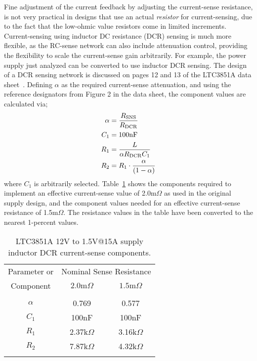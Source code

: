 Fine adjustment of the current feedback by adjusting the
current-sense resistance, is not very practical in designs that use an
actual {\em resistor} for current-sensing, due to the fact that the
low-ohmic value resistors come in limited increments. Current-sensing using
inductor DC resistance (DCR) sensing is much more flexible, as the RC-sense network
can also include attenuation control, providing the flexibility
to scale the current-sense gain arbitrarily. 
%
For example, the power supply just analyzed can be converted to use 
inductor DCR sensing. The design of a DCR sensing network is discussed
on pages 12 and 13 of the LTC3851A data 
sheet~\cite{Linear_LTC3851A_2010}. Defining $\alpha$ as the required
current-sense attenuation, and using the reference designators
from Figure 2 in the data sheet, the component values are calculated
via;
%
\begin{equation}
\begin{split}
\alpha &= \frac{R_{\rm SNS}}{R_{\rm DCR}}\\
C_1 &= 100\text{nF}\\
R_1 &= \frac{L}{\alpha R_{\rm DCR}C_1}\\
R_2 &= R_1\cdot\frac{\alpha}{(1-\alpha)}
\end{split}
\end{equation}
%
where $C_1$ is arbitrarily selected. Table~\ref{tab:LTC3851A_ex3_dcr_sensing}
shows the components required to implement an effective current-sense
value of 2.0m$\Omega$ as used in the original supply design, and the component
values needed for an effective current-sense resistance of 1.5m$\Omega$.
The resistance values in the table have been converted to the
nearest 1-percent values. 

\begin{table}[t]
\caption{LTC3851A 12V to 1.5V@15A supply inductor DCR current-sense components.}
\label{tab:LTC3851A_ex3_dcr_sensing}
\begin{center}
\begin{tabular}{|c|c|c|}
\hline
\rule{0cm}{4mm}Parameter or & \multicolumn{2}{c|}{Nominal Sense Resistance} \\
\cline{2-3}
\rule{0cm}{4mm}Component    & $2.0\text{m}\Omega$ & $1.5\text{m}\Omega$ \\
\hline\hline
         &\hspace {20mm} &\hspace {20mm}\\
$\alpha$ & 0.769         & 0.577         \\
$C_1$    & 100nF         & 100nF         \\
$R_1$    & 2.37k$\Omega$ & 3.16k$\Omega$ \\
$R_2$    & 7.87k$\Omega$ & 4.32k$\Omega$ \\
&&\\
\hline
\end{tabular}
\end{center}
\end{table}

